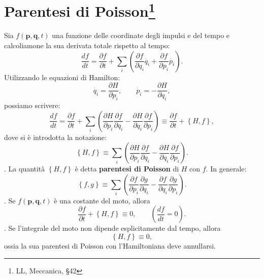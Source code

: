 \documentclass[a4paper,12pt,oneside]{book}
\begin{document}
\section[Parentesi di Poisson]{Parentesi di Poisson\footnote{LL, Meccanica, \S 42}}
Sia $f(\mathbf{p},\mathbf{q},t)$ una funzione delle coordinate degli impulsi e del tempo e calcoliamone la sua derivata totale rispetto al tempo:
\begin{equation}
\frac{df}{dt}= \frac{\partial f}{\partial t} + \sum_i \left( \frac{\partial f}{\partial q_i} \dot {q_i} + \frac{\partial f}{\partial p_i} \dot {p_i} \right).
\end{equation}
Utilizzando le equazioni di Hamilton:
\begin{equation}
\dot{q_i}=\frac{\partial H}{\partial p_i} , \qquad \dot{p_i}=-\frac{\partial H}{\partial q_i} ,
\end{equation}
possiamo scrivere:
\begin{equation}
\frac{df}{dt}=	\frac{\partial f}{\partial t} + \sum_i \left( \frac{\partial H}{\partial p_i}\frac{\partial f}{\partial q_i}-\frac{\partial H}{\partial q_i}\frac{\partial f}{\partial p_i}\right) \equiv \frac{\partial f}{\partial t} + \left\lbrace H,f \right\rbrace ,
\end{equation}
dove si \`e introdotta la notazione:
\begin{equation}
\left\lbrace H,f \right\rbrace \equiv \sum_i \left(\frac{\partial H}{\partial p_i}\frac{\partial f}{\partial q_i}-\frac{\partial H}{\partial q_i}\frac{\partial f}{\partial p_i}\right)  .
\end{equation}.
La quantit\`a $\left\lbrace H,f \right\rbrace$ è detta \textbf{parentesi di Poisson} di $H$ con $f$. In generale:
\begin{equation}
\left\lbrace f,g \right\rbrace \equiv \sum_i \left(\frac{\partial f}{\partial p_i}\frac{\partial g}{\partial q_i}-\frac{\partial f}{\partial q_i}\frac{\partial g}{\partial p_i}\right)  .
\end{equation}.
Se $f(\mathbf{p},\mathbf{q},t)$ \`e una costante del moto, allora
\begin{equation}
\frac{\partial f}{\partial t}+\left\lbrace H,f \right\rbrace   \equiv 0 , \qquad
\left( \frac{df}{dt}=0 \right) .
\end{equation}.
Se l'integrale del moto non dipende esplicitamente dal tempo, allora
\begin{equation}
\left\lbrace H,f \right\rbrace  \equiv 0 ,
\end{equation}
ossia la sua parentesi di Poisson con l'Hamiltoniana deve annullarsi.\\
\end{document}
